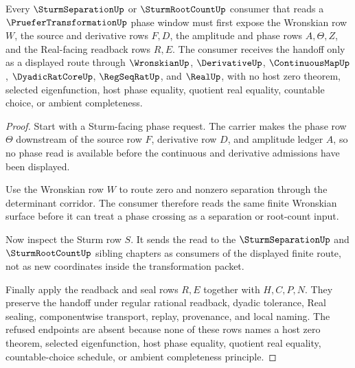\begin{theorem}
\label{thm:pruefer-transformation-wronskian-sturm-handoff}
Every $\SturmSeparationUp$ or $\SturmRootCountUp$ consumer that reads a $\PrueferTransformationUp$ phase window must first expose the Wronskian row $W$, the source and derivative rows $F,D$, the amplitude and phase rows $A,\Theta,Z$, and the Real-facing readback rows $R,E$. The consumer receives the handoff only as a displayed route through $\WronskianUp$, $\DerivativeUp$, $\ContinuousMapUp$, $\DyadicRatCoreUp$, $\RegSeqRatUp$, and $\RealUp$, with no host zero theorem, selected eigenfunction, host phase equality, quotient real equality, countable choice, or ambient completeness.
\end{theorem}
\begin{proof}
Start with a Sturm-facing phase request. The carrier makes the phase row $\Theta$ downstream of the source row $F$, derivative row $D$, and amplitude ledger $A$, so no phase read is available before the continuous and derivative admissions have been displayed.

Use the Wronskian row $W$ to route zero and nonzero separation through the determinant corridor. The consumer therefore reads the same finite Wronskian surface before it can treat a phase crossing as a separation or root-count input.

Now inspect the Sturm row $S$. It sends the read to the $\SturmSeparationUp$ and $\SturmRootCountUp$ sibling chapters as consumers of the displayed finite route, not as new coordinates inside the transformation packet.

Finally apply the readback and seal rows $R,E$ together with $H,C,P,N$. They preserve the handoff under regular rational readback, dyadic tolerance, Real sealing, componentwise transport, replay, provenance, and local naming. The refused endpoints are absent because none of these rows names a host zero theorem, selected eigenfunction, host phase equality, quotient real equality, countable-choice schedule, or ambient completeness principle.
\end{proof}



